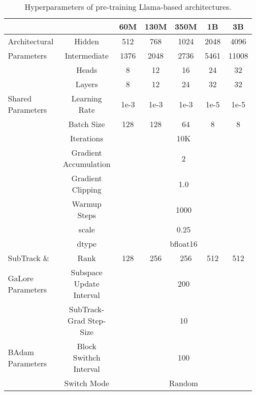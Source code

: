\begin{table*}[h]
    \caption{Hyperparameters of pre-training Llama-based architectures.}
    \centering
    \label{tab:pt_hyperparameters}
    \begin{tabular}{l|c|ccccc}
    \midrule
    \midrule
    & & 60M   & 130M & 350M & 1B & 3B   \\
    \midrule
    \midrule
    Architectural & Hidden        &512  &768  &1024 &2048 &4096 \\
    Parameters &Intermediate  &1376 &2048 &2736 &5461 &11008 \\
    &Heads         &8    &12   &16 &24 &32 \\
    &Layers        &8    &12   &24 &32 &32 \\
    \midrule
    Shared Parameters & Learning Rate &1e-3  &1e-3  &1e-3 &1e-5 &1e-5   \\
    & Batch Size    &128  &128  &64 &8 &8   \\
    & Iterations & \multicolumn{5}{c}{10K} \\
    & Gradient Accumulation & \multicolumn{5}{c}{2} \\
    & Gradient Clipping & \multicolumn{5}{c}{1.0} \\
    & Warmup Steps & \multicolumn{5}{c}{1000} \\
    & scale & \multicolumn{5}{c}{0.25} \\
    & dtype & \multicolumn{5}{c}{bfloat16} \\
    \midrule
    SubTrack \& &Rank          &128  &256  &256 &512 &512   \\
    GaLore Parameters & Subspace Update Interval & \multicolumn{5}{c}{200} \\
    &SubTrack-Grad Step-Size & \multicolumn{5}{c}{10} \\
    \midrule
    BAdam Parameters & Block Swithch Interval & \multicolumn{5}{c}{100} \\
    & Switch Mode & \multicolumn{5}{c}{Random} \\
    \bottomrule
    \end{tabular}
\end{table*}
